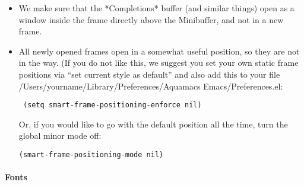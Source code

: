 \begin{itemize}
\item We make sure that the *Completions* buffer (and similar things)
    open as a window inside the frame directly above the Minibuffer,
    and not in a new frame.

\item All newly opened frames open in a somewhat useful position, so
they are not in the way. (If you do not like this, we suggest you set
    your own static frame positions via ``set current style as default''
    and also add this to your file /Users/yourname/Library/Preferences/Aquamacs
    Emacs/Preferences.el:

        \texttt{ (setq smart-frame-positioning-enforce nil)}

Or, if you would like to go with the default position all the time,
    turn the global minor mode off:

   \texttt{(smart-frame-positioning-mode nil)}
\end{itemize}


\paragraph{Fonts}

